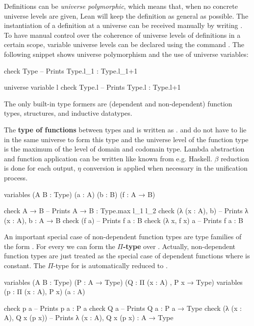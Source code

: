 Definitions can be \emph{universe polymorphic}, which means that, when no concrete
universe levels are given, Lean will keep the definition as general as possible.
The instantiation of a definition  at a universe  can be received
manually by writing .
To have manual control over the coherence of universe levels of definitions in
a certain scope, variable universe levels can be declared using the command
. The following snippet shows universe polymorphism
and the use of universe variables:
\begin{leancode}
check Type -- Prints Type.{l_1} : Type.{l_1+1}

universe variable l
check Type.{l} -- Prints Type.{l} : Type.{l+1}
\end{leancode}

The only built-in type formers are (dependent and non-dependent) function types,
structures, and inductive datatypes.

The \textbf{type of functions} between types  and  is written
as .
 and  do not have to lie in the same universe to form this type
and the universe level of the function type is the maximum of the level of domain
and codomain type.
Lambda abstraction and function application can be written like known from e.g.
Haskell.
$\beta$ reduction is done for each output, $\eta$ conversion is applied when necessary
in the unification process.
\begin{leancode}
variables (A B : Type) (a : A) (b : B) (f : A → B)

check A → B -- Prints A → B : Type.{max l_1 l_2}
check (λ (x : A), b) -- Prints λ (x : A), b : A → B
check (f a) -- Prints f a : B
check (λ x, f x) a -- Prints f a : B
\end{leancode}

An important special case of non-dependent function types are type families
of the form . For every  we can form the
\textbf{$\Pi$-type}  over .
Actually, non-dependent function types are just treated as the special case of
dependent functions where  is constant.
The $\Pi$-type  for  is automatically reduced
to .
\begin{leancode}
variables (A B : Type) (P : A → Type) (Q : Π (x : A) , P x → Type)
variables (p : Π (x : A), P x) (a : A)

check p a -- Prints p a : P a
check Q a -- Prints Q a : P a → Type
check (λ (x : A), Q x (p x)) -- Prints λ (x : A), Q x (p x) : A → Type
\end{leancode}

